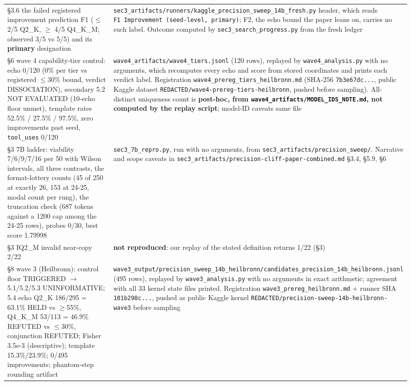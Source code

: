 \begin{longtable}[]{@{}>{\raggedright\arraybackslash}p{0.400\linewidth}>{\raggedright\arraybackslash}p{0.560\linewidth}@{}}
§3.6 the failed registered improvement prediction F1 (\(\leq\) 2/5 Q2\_K, \(\geq\) 4/5 Q4\_K\_M; observed 3/5 vs 5/5) and its \textbf{primary} designation & \texttt{sec3\_\allowbreak artifacts/\allowbreak runners/\allowbreak kaggle\_\allowbreak precision\_\allowbreak sweep\_\allowbreak 14b\_\allowbreak fresh.py} header, which reads \texttt{F1\ Improvement\ (seed-level,\ primary)}; F2, the echo bound the paper leans on, carries no such label. Outcome computed by \texttt{sec3\_search\_progress.py} from the fresh ledger \\
§6 wave 4 capability-tier control: echo 0/120 (0\% per tier vs registered \(\leq\)30\% bound, verdict DISSOCIATION), secondary 5.2 NOT EVALUATED (10-echo floor unmet), template rates 52.5\% / 27.5\% / 97.5\%, zero improvements past seed, \texttt{tool\_uses} 0/120 & \texttt{wave4\_artifacts/wave4\_tiers.jsonl} (120 rows), replayed by \texttt{wave4\_analysis.py} with no arguments, which recomputes every echo and score from stored coordinates and prints each verdict label. Registration \texttt{wave4\_prereg\_tiers\_heilbronn.md} (SHA-256 \texttt{7b3e67dc...}, public Kaggle dataset \texttt{REDACTED/wave4-prereg-tiers-heilbronn}, pushed before sampling). All-distinct uniqueness count is \textbf{post-hoc, from \texttt{wave4\_artifacts/MODEL\_IDS\_NOTE.md}, not computed by the replay script}; model-ID caveats same file \\
§3 7B ladder: viability 7/6/9/7/16 per 50 with Wilson intervals, all three contrasts, the format-lottery counts (45 of 250 at exactly 26, 153 at 24-25, modal count per rung), the truncation check (687 tokens against a 1200 cap among the 24-25 rows), probes 0/30, best score 1.79998 & \texttt{sec3\_7b\_repro.py}, run with no arguments, from \texttt{sec3\_artifacts/precision\_sweep/}. Narrative and scope caveats in \texttt{sec3\_\allowbreak artifacts/\allowbreak precision-cliff-paper-combined.md} §3.4, §5.9, §6 \\
§3 IQ2\_M invalid near-copy 2/22 & \textbf{not reproduced}: our replay of the stated definition returns 1/22 (§3) \\
§8 wave 3 (Heilbronn): control floor TRIGGERED \(\rightarrow\) 5.1/5.2/5.3 UNINFORMATIVE; 5.4 echo Q2\_K 186/295 = 63.1\% HELD vs \(\geq\)55\%, Q4\_K\_M 53/113 = 46.9\% REFUTED vs \(\leq\)30\%, conjunction REFUTED; Fisher 3.5e-3 (descriptive); template 15.3\%/23.9\%; 0/495 improvements; phantom-step rounding artifact & \texttt{wave3\_\allowbreak output/\allowbreak precision\_\allowbreak sweep\_\allowbreak 14b\_\allowbreak heilbronn/\allowbreak candidates\_\allowbreak precision\_\allowbreak 14b\_\allowbreak heilbronn.jsonl} (495 rows), replayed by \texttt{wave3\_analysis.py} with no arguments in exact arithmetic; agreement with all 33 kernel state files printed. Registration \texttt{wave3\_prereg\_heilbronn.md} + runner SHA \texttt{101b298c...}, pushed as public Kaggle kernel \texttt{REDACTED/\allowbreak precision-sweep-14b-heilbronn-wave3} before sampling \\

\end{longtable}
